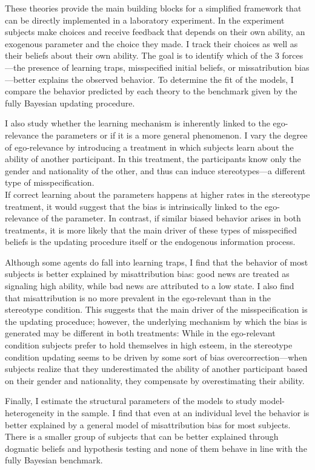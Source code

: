 \documentclass[
  12pt,
]{article}
\begin{document}
These theories provide the main building blocks for a simplified
framework that can be directly implemented in a laboratory experiment.
In the experiment subjects make choices and receive feedback that
depends on their own ability, an exogenous parameter and the choice they
made. I track their choices as well as their beliefs about their own
ability. The goal is to identify which of the 3 forces---the presence of
learning traps, misspecified initial beliefs, or missatribution
bias---better explains the observed behavior. To determine the fit of
the models, I compare the behavior predicted by each theory to the
benchmark given by the fully Bayesian updating procedure.

I also study whether the learning mechanism is inherently linked to the
ego-relevance the parameters or if it is a more general phenomenon. I
vary the degree of ego-relevance by introducing a treatment in which
subjects learn about the ability of another participant. In this
treatment, the participants know only the gender and nationality of the
other, and thus can induce stereotypes---a different type of
misspecification.\\
If correct learning about the parameters happens at higher rates in the
stereotype treatment, it would suggest that the bias is intrinsically
linked to the ego-relevance of the parameter. In contrast, if similar
biased behavior arises in both treatments, it is more likely that the
main driver of these types of misspecified beliefs is the updating
procedure itself or the endogenous information process.

Although some agents do fall into learning traps, I find that the
behavior of most subjects is better explained by misattribution bias:
good news are treated as signaling high ability, while bad news are
attributed to a low state. I also find that misattribution is no more
prevalent in the ego-relevant than in the stereotype condition. This
suggests that the main driver of the misspecification is the updating
proceduce; however, the underlying mechanism by which the bias is
generated may be different in both treatments: While in the ego-relevant
condition subjects prefer to hold themselves in high esteem, in the
stereotype condition updating seems to be driven by some sort of bias
overcorrection---when subjects realize that they underestimated the
ability of another participant based on their gender and nationality,
they compensate by overestimating their ability.

Finally, I estimate the structural parameters of the models to study
model-heterogeneity in the sample. I find that even at an individual
level the behavior is better explained by a general model of
misattribution bias for most subjects. There is a smaller group of
subjects that can be better explained through dogmatic beliefs and
hypothesis testing and none of them behave in line with the fully
Bayesian benchmark.
\end{document}
